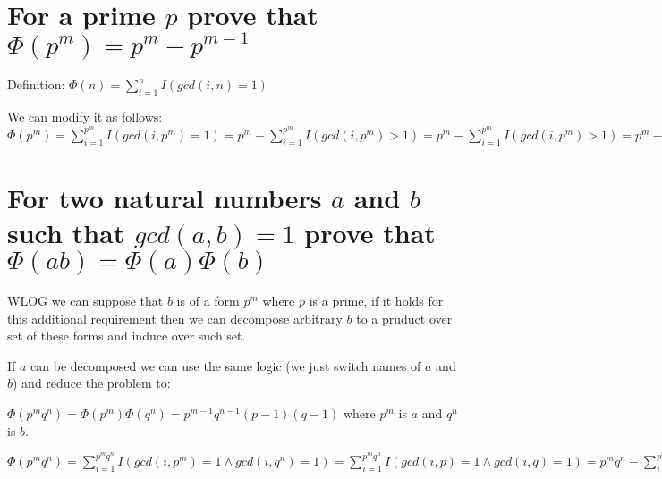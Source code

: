 \documentclass[11pt]{article}
\begin{document}
    \part*{For a prime $p$ prove that $\Phi(p^m) = p^m - p^{m-1}$}

    Definition: $\Phi(n) = \sum\limits_{i=1}^n I(gcd(i,n) = 1)$

    We can modify it as follows: $\Phi(p^m) = \sum\limits_{i=1}^{p^m} I(gcd(i,p^m) = 1) = p^m - \sum\limits_{i=1}^{p^m} I(gcd(i,p^m) > 1) = p^m - \sum\limits_{i=1}^{p^m} I(gcd(i,p^m) > 1) = p^m - |\{p, 2p, \dots p^m\}| = p^m - |\{1, 2, \dots p^{m-1}\}| = p^m - p^{m-1} = p^{m-1}(p-1) \square$

    \part*{For two natural numbers $a$ and $b$ such that $gcd(a, b) = 1$ prove that $\Phi(ab) = \Phi(a) \Phi(b)$}

    WLOG we can suppose that $b$ is of a form $p^m$ where $p$ is a prime, if it holds for this additional requirement then we can decompose arbitrary $b$ to a pruduct over set of these forms and induce over such set.

    If $a$ can be decomposed we can use the same logic (we just switch names of $a$ and $b$) and reduce the problem to:

    $\Phi(p^m q^n) = \Phi(p^m) \Phi(q^n) = p^{m-1} q^{n-1} (p-1)(q-1)$ where $p^m$ is $a$ and $q^n$ is $b$.

    $\Phi(p^m q^n) = \sum\limits_{i=1}^{p^m q^n} I(gcd(i,p^m) = 1 \wedge gcd(i,q^n) = 1) = \sum\limits_{i=1}^{p^m q^n} I(gcd(i,p) = 1 \wedge gcd(i,q) = 1) = p^m q^n - \sum\limits_{i=1}^{p^m q^n} I(gcd(i,p) > 1 \vee gcd(i,q) > 1) = p^m q^n - |\{p,2p,\dots p^m q^n\}| - |\{q,2q,\dots p^m q^n\}| + |\{pq,2pq,\dots p^m q^n\}| = p^m q^n - p^{m-1} q^n - p^m q^{n-1} + p^{m-1} q^{n-1} = p^{m-1} q^{n-1} (pq - p - q + 1) = p^{m-1} q^{n-1} (p-1) (q-1) \square$
\end{document}
